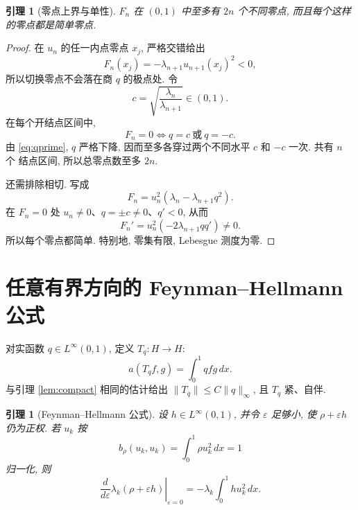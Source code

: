 \documentclass[UTF8]{ctexart}
\newtheorem{lemma}[theorem]{引理}
\begin{document}
\begin{lemma}[零点上界与单性]\label{lem:zeros}
$F_n$ 在 $(0,1)$ 中至多有 $2n$ 个不同零点, 而且每个这样的零点都是简单零点.
\end{lemma}

\begin{proof}
在 $u_n$ 的任一内点零点 $x_j$, 严格交错给出
\begin{equation*}
	F_n(x_j)=-\lambda_{n+1}u_{n+1}(x_j)^2<0,
\end{equation*}
所以切换零点不会落在商 $q$ 的极点处. 令
\begin{equation*}
	c=\sqrt{\frac{\lambda_n}{\lambda_{n+1}}}\in(0,1) .
\end{equation*}
在每个开结点区间中,
\begin{equation}
	F_n=0\iff q=c\ \text{或}\ q=-c .
	\label{eq:cross}
\end{equation}
由 \eqref{eq:qprime}, $q$ 严格下降, 因而至多各穿过两个不同水平 $c$ 和 $-c$ 一次. 共有 $n$ 个
结点区间, 所以总零点数至多 $2n$.

还需排除相切. 写成
\begin{equation*}
	F_n=u_n^2\left(\lambda_n-\lambda_{n+1}q^2\right) .
\end{equation*}
在 $F_n=0$ 处 $u_n\ne0$、$q=\pm c\ne0$、$q'<0$, 从而
\begin{equation*}
	F_n'=u_n^2(-2\lambda_{n+1}qq')\ne0 .
\end{equation*}
所以每个零点都简单. 特别地, 零集有限, Lebesgue 测度为零.
\end{proof}

\section{任意有界方向的 Feynman--Hellmann 公式}

对实函数 $q\in L^\infty(0,1)$, 定义 $T_q:H\to H$:
\begin{equation}
	a(T_qf,g)=\int_0^1 qfg\,dx .
	\label{eq:tq}
\end{equation}
与引理 \ref{lem:compact} 相同的估计给出 $\|T_q\|\le C\|q\|_\infty$, 且 $T_q$ 紧、自伴.

\begin{lemma}[Feynman--Hellmann 公式]\label{lem:fh}
设 $h\in L^\infty(0,1)$, 并令 $\varepsilon$ 足够小, 使 $\rho+\varepsilon h$ 仍为正权. 若
$u_k$ 按
\begin{equation*}
	b_\rho(u_k,u_k)=\int_0^1\rho u_k^2\,dx=1
\end{equation*}
归一化, 则
\begin{equation}
	\left.\frac{d}{d\varepsilon}\lambda_k(\rho+\varepsilon h)\right|_{\varepsilon=0}
		=-\lambda_k\int_0^1 hu_k^2\,dx .
	\label{eq:fh}
\end{equation}
\end{lemma}
\end{document}
